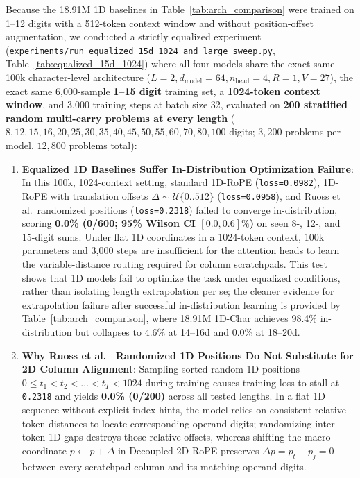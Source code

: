 \documentclass[10pt,twocolumn]{article}
\begin{document}
Because the 18.91M 1D baselines in Table~\ref{tab:arch_comparison} were trained on 1--12 digits with a 512-token context window and without position-offset augmentation, we conducted a strictly equalized experiment (\texttt{experiments/run\_equalized\_15d\_1024\_and\_large\_sweep.py}, Table~\ref{tab:equalized_15d_1024}) where all four models share the exact same 100k character-level architecture ($L=2, d_{\text{model}}=64, n_{\text{head}}=4, R=1, V=27$), the exact same 6,000-sample \textbf{1--15 digit} training set, a \textbf{1024-token context window}, and 3,000 training steps at batch size 32, evaluated on \textbf{200 stratified random multi-carry problems at every length} ($8, 12, 15, 16, 20, 25, 30, 35, 40, 45, 50, 55, 60, 70, 80, 100$ digits; $3{,}200$ problems per model, $12{,}800$ problems total):
\begin{enumerate}[leftmargin=*,nosep]
    \item \textbf{Equalized 1D Baselines Suffer In-Distribution Optimization Failure}: In this 100k, 1024-context setting, standard 1D-RoPE (\texttt{loss=0.0982}), 1D-RoPE with translation offsets $\Delta \sim \mathcal{U}\{0..512\}$ (\texttt{loss=0.0958}), and Ruoss et al.\ randomized positions (\texttt{loss=0.2318}) failed to converge in-distribution, scoring \textbf{0.0\% (0/600; 95\% Wilson CI $[0.0, 0.6]\%$)} on seen 8-, 12-, and 15-digit sums. Under flat 1D coordinates in a 1024-token context, 100k parameters and 3,000 steps are insufficient for the attention heads to learn the variable-distance routing required for column scratchpads. This test shows that 1D models fail to optimize the task under equalized conditions, rather than isolating length extrapolation per se; the cleaner evidence for extrapolation failure after successful in-distribution learning is provided by Table~\ref{tab:arch_comparison}, where 18.91M 1D-Char achieves 98.4\% in-distribution but collapses to 4.6\% at 14--16d and 0.0\% at 18--20d.
    \item \textbf{Why Ruoss et al.\ \cite{ruoss2023randomized} Randomized 1D Positions Do Not Substitute for 2D Column Alignment}: Sampling sorted random 1D positions $0 \le t_1 < t_2 < \dots < t_T < 1024$ during training causes training loss to stall at \texttt{0.2318} and yields \textbf{0.0\% (0/200)} across all tested lengths. In a flat 1D sequence without explicit index hints, the model relies on consistent relative token distances to locate corresponding operand digits; randomizing inter-token 1D gaps destroys those relative offsets, whereas shifting the macro coordinate $p \leftarrow p + \Delta$ in Decoupled 2D-RoPE preserves $\Delta p = p_t - p_j = 0$ between every scratchpad column and its matching operand digits.

\end{enumerate}
\end{document}
